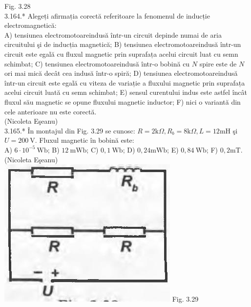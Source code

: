Fig. 3.28\\

3.164.* Alegeți afirmația corectă referitoare la fenomenul de inducție electromagnetică:\\ A) tensiunea electromotoareindusă într-un circuit depinde numai de aria circuitului şi de inducția magnetică; B) tensiunea electromotoareindusă într-un circuit este egală cu fluxul magnetic prin suprafața acelui circuit luat cu semn schimbat; C) tensiunea electromotoareindusă într-o bobină cu $N$ spire este de $N$ ori mai mică decât cea indusă într-o spiră; D) tensiunea electromotoareindusă într-un circuit este egală cu viteza de variație a fluxului magnetic prin suprafața acelui circuit luată cu semn schimbat; E) sensul curentului indus este astfel încât fluxul său magnetic se opune fluxului magnetic inductor; F) nici o variantă din cele anterioare nu este corectă.\\ (Nicoleta Eşeanu)\\

3.165.* În montajul din Fig. 3.29 se cunosc: $R=2 \mathrm{k} \Omega, R_{b}=8 \mathrm{k} \Omega, L=12 \mathrm{mH}$ şi $U=200 \mathrm{~V}$. Fluxul magnetic în bobină este:\\ A) $6 \cdot 10^{-5} \mathrm{~Wb}$; B) $12 \mathrm{~mWb}$; C) $0,1 \mathrm{~Wb}$; D) $0,24 \mathrm{mWb}$; E) $0,84 \mathrm{~Wb}$; F) $0,2 \mathrm{mT}$.\\ (Nicoleta Eşeanu)\\ \includegraphics[width=0.4\linewidth]{images/2025_07_01_5b3ff9fa0d508c8e9f17g-180} Fig. 3.29\\

